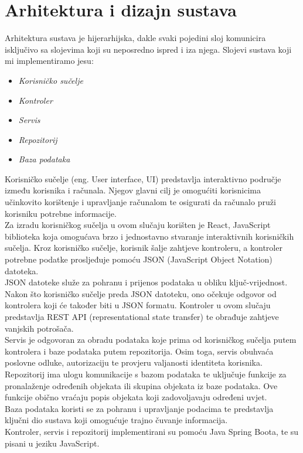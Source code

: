 \chapter{Arhitektura i dizajn sustava}

		{ Arhitektura sustava je hijerarhijska, dakle svaki pojedini sloj
			komunicira isključivo sa slojevima koji su neposredno ispred i iza njega. Slojevi sustava koji mi implementiramo jesu:}
	\begin{itemize}
		\item 	\textit{Korisničko sučelje}
		\item 	\textit{Kontroler}
		\item 	\textit{Servis}
		\item 	\textit{Repozitorij}
		\item 	\textit{Baza podataka}		
	\end{itemize}
	
		{Korisničko sučelje (eng. User interface, UI) predstavlja interaktivno područje između korisnika i računala. Njegov glavni cilj je omogućiti korisnicima učinkovito korištenje i upravljanje računalom te osigurati da računalo pruži korisniku potrebne informacije.\\
			
			Za izradu korisničkog sučelja u ovom slučaju korišten je React, JavaScript biblioteka koja omogućava brzo i jednostavno stvaranje interaktivnih korisničkih sučelja. Kroz korisničko sučelje, korisnik šalje zahtjeve kontroleru, a kontroler potrebne podatke prosljeđuje pomoću JSON (JavaScript Object Notation) datoteka.\\
			
			JSON datoteke služe za pohranu i prijenos podataka u obliku ključ-vrijednost. Nakon što korisničko sučelje preda JSON datoteku, ono očekuje odgovor od kontrolera koji će također biti u JSON formatu. Kontroler u ovom slučaju predstavlja REST API (representational state transfer) te obrađuje zahtjeve vanjskih potrošača.\\
			
			Servis je odgovoran za obradu podataka koje prima od korisničkog sučelja putem kontrolera i baze podataka putem repozitorija. Osim toga, servis obuhvaća poslovne odluke, autorizaciju te provjeru valjanosti identiteta korisnika.\\
			
			Repozitorij ima ulogu komunikacije s bazom podataka te uključuje funkcije za pronalaženje određenih objekata ili skupina objekata iz baze podataka. Ove funkcije obično vraćaju popis objekata koji zadovoljavaju određeni uvjet.\\
			
			Baza podataka koristi se za pohranu i upravljanje podacima te predstavlja ključni dio sustava koji omogućuje trajno čuvanje informacija.\\
			
			Kontroler, servis i repozitorij implementirani su pomoću Java Spring Boota, te su pisani u jeziku JavaScript.}

